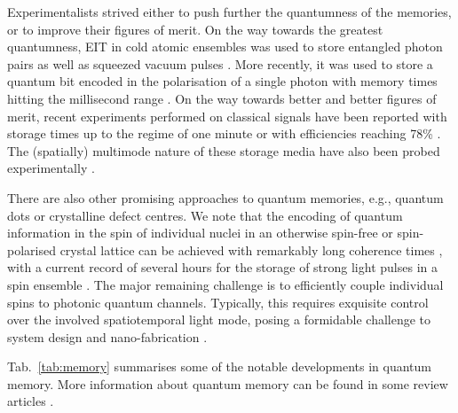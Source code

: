 Experimentalists strived either to push further the quantumness of the memories, or to improve their figures of merit. On the way towards the greatest quantumness, EIT in cold atomic ensembles was used to store entangled photon pairs \cite{bib:Choi2008mapping} as well as squeezed vacuum pulses \cite{bib:appel2008quantum, bib:honda2008storage}. More recently, it was used to store a quantum bit encoded in the polarisation of a single photon with memory times hitting the millisecond range \cite{bib:lettner2011remote, bib:riedl2012bose, bib:xu2013long}. On the way towards better and better figures of merit, recent experiments performed on classical signals have been reported with storage times up to the regime of one minute \cite{bib:heinze2013stopped} or with efficiencies reaching 78\% \cite{bib:chen2013coherent}. The (spatially) multimode nature of these storage media have also been probed experimentally \cite{bib:ding2013single}.

There are also other promising approaches to quantum memories, e.g., quantum dots or crystalline defect centres. We note that the encoding of quantum information in the spin of individual nuclei in an otherwise spin-free or spin-polarised crystal lattice can be achieved with remarkably long coherence times \cite{bib:steger2012quantum, bib:saeedi2013room}, with a current record of several hours for the storage of strong light pulses in a spin ensemble \cite{bib:zhong2015optically}. The major remaining challenge is to efficiently couple individual spins to photonic quantum channels. Typically, this requires exquisite control over the involved spatiotemporal light mode, posing a formidable challenge to system design and nano-fabrication \cite{bib:reiserer2015cavity}.

Tab.~\ref{tab:memory} summarises some of the notable developments in quantum memory. More information about quantum memory can be found in some review articles \cite{bib:lvovsky2009optical, bib:simon2010quantum, bib:sangouard2011quantum, bib:bussieres2013prospective, bib:reiserer2015cavity}.

